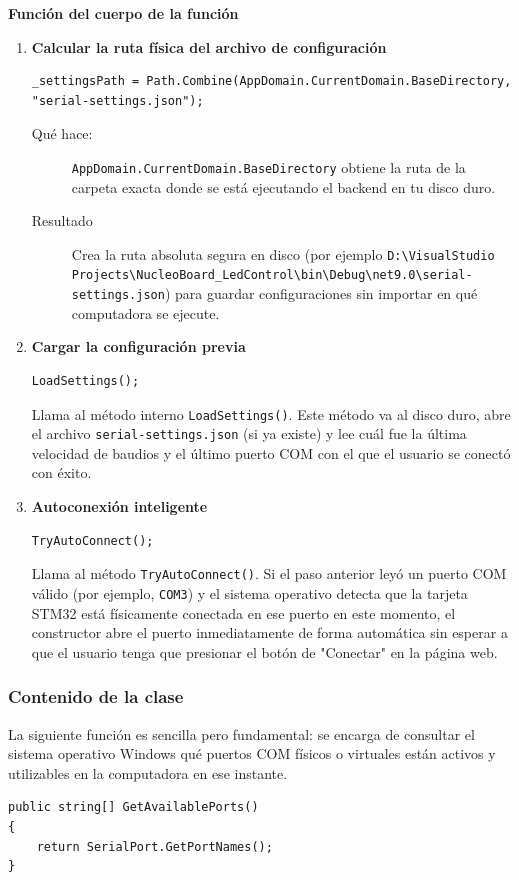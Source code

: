 \documentclass[
10pt, %
a4paper, %
oneside, %
headinclude,footinclude, %
BCOR5mm, %
]{scrartcl}
\begin{document}
\textbf{Función del cuerpo de la función} \\

\begin{enumerate}
	\item \textbf{Calcular la ruta física del archivo de configuración}
	\begin{lstlisting}[style=csharpStyle]
	_settingsPath = Path.Combine(AppDomain.CurrentDomain.BaseDirectory, "serial-settings.json");
	\end{lstlisting}
	\begin{description}
		\item[Qué hace:] \texttt{AppDomain.CurrentDomain.BaseDirectory} obtiene la ruta de la carpeta exacta donde se está ejecutando el backend en tu disco duro.
		\item[Resultado] Crea la ruta absoluta segura en disco (por ejemplo \texttt{D:\textbackslash VisualStudio\\Projects\textbackslash NucleoBoard\_LedControl\textbackslash bin\textbackslash Debug\textbackslash net9.0\textbackslash serial-settings.json}) para guardar configuraciones sin importar en qué computadora se ejecute.
	\end{description}
	\item \textbf{Cargar la configuración previa}
	\begin{lstlisting}[style=csharpStyle]
		LoadSettings();
	\end{lstlisting}
	Llama al método interno \texttt{LoadSettings()}. Este método va al disco duro, abre el archivo \texttt{serial-settings.json} (si ya existe) y lee cuál fue la última velocidad de baudios y el último puerto COM con el que el usuario se conectó con éxito.
	\item \textbf{Autoconexión inteligente}
	\begin{lstlisting}[style=csharpStyle]
		TryAutoConnect();
	\end{lstlisting}
	Llama al método \texttt{TryAutoConnect()}. Si el paso anterior leyó un puerto COM válido (por ejemplo, \texttt{COM3}) y el sistema operativo detecta que la tarjeta STM32 está físicamente conectada en ese puerto en este momento, el constructor abre el puerto inmediatamente de forma automática sin esperar a que el usuario tenga que presionar el botón de "Conectar" en la página web.
\end{enumerate}

\subsubsection{Contenido de la clase}
La siguiente función es sencilla pero fundamental: se encarga de consultar el sistema operativo Windows qué puertos COM físicos o virtuales están activos y utilizables en la computadora en ese instante. 
\begin{lstlisting}[style=csharpStyle]
public string[] GetAvailablePorts()
{
	return SerialPort.GetPortNames();
}
\end{lstlisting}
\end{document}
